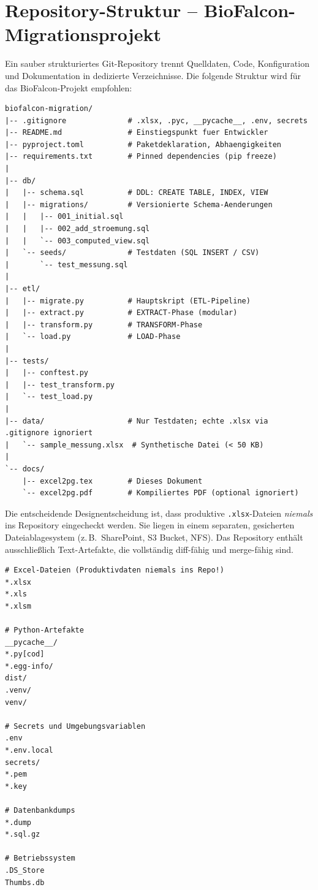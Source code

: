 \documentclass[12pt,a4paper]{report}
\theoremstyle{definition}
\theoremstyle{remark}
\newcommand{\code}[1]{\texttt{#1}}
\begin{document}
\section{Repository-Struktur -- BioFalcon-Migrationsprojekt}

Ein sauber strukturiertes Git-Repository trennt Quelldaten, Code,
Konfiguration und Dokumentation in dedizierte Verzeichnisse.
Die folgende Struktur wird für das BioFalcon-Projekt empfohlen:

\begin{lstlisting}[style=bash, caption={Empfohlene Monorepo-Struktur}]
biofalcon-migration/
|-- .gitignore              # .xlsx, .pyc, __pycache__, .env, secrets
|-- README.md               # Einstiegspunkt fuer Entwickler
|-- pyproject.toml          # Paketdeklaration, Abhaengigkeiten
|-- requirements.txt        # Pinned dependencies (pip freeze)
|
|-- db/
|   |-- schema.sql          # DDL: CREATE TABLE, INDEX, VIEW
|   |-- migrations/         # Versionierte Schema-Aenderungen
|   |   |-- 001_initial.sql
|   |   |-- 002_add_stroemung.sql
|   |   `-- 003_computed_view.sql
|   `-- seeds/              # Testdaten (SQL INSERT / CSV)
|       `-- test_messung.sql
|
|-- etl/
|   |-- migrate.py          # Hauptskript (ETL-Pipeline)
|   |-- extract.py          # EXTRACT-Phase (modular)
|   |-- transform.py        # TRANSFORM-Phase
|   `-- load.py             # LOAD-Phase
|
|-- tests/
|   |-- conftest.py
|   |-- test_transform.py
|   `-- test_load.py
|
|-- data/                   # Nur Testdaten; echte .xlsx via .gitignore ignoriert
|   `-- sample_messung.xlsx  # Synthetische Datei (< 50 KB)
|
`-- docs/
    |-- excel2pg.tex        # Dieses Dokument
    `-- excel2pg.pdf        # Kompiliertes PDF (optional ignoriert)
\end{lstlisting}

Die entscheidende Designentscheidung ist, dass produktive \code{.xlsx}-Dateien
\emph{niemals} ins Repository eingecheckt werden. Sie liegen in einem
separaten, gesicherten Dateiablagesystem (z.\,B.\ SharePoint, S3 Bucket,
NFS). Das Repository enthält ausschließlich Text-Artefakte, die vollständig
diff-fähig und merge-fähig sind.

\begin{lstlisting}[style=bash, caption={.gitignore für das Migrationsprojekt}]
# Excel-Dateien (Produktivdaten niemals ins Repo!)
*.xlsx
*.xls
*.xlsm

# Python-Artefakte
__pycache__/
*.py[cod]
*.egg-info/
dist/
.venv/
venv/

# Secrets und Umgebungsvariablen
.env
*.env.local
secrets/
*.pem
*.key

# Datenbankdumps
*.dump
*.sql.gz

# Betriebssystem
.DS_Store
Thumbs.db
\end{lstlisting}
\end{document}
